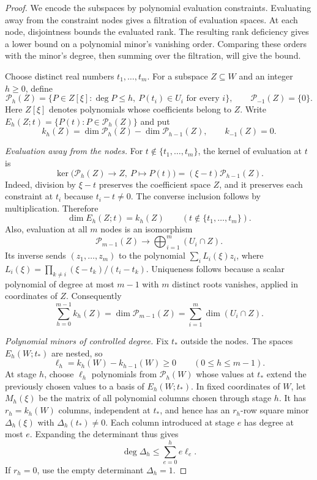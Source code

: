 \begin{proof}
We encode the subspaces by polynomial evaluation constraints.  Evaluating
away from the constraint nodes gives a filtration of evaluation spaces.
At each node, disjointness bounds the evaluated rank.  The resulting
rank deficiency gives a lower bound on a polynomial minor's vanishing
order.  Comparing these orders with the minor's degree, then summing
over the filtration, will give the bound.

Choose distinct real numbers $t_1,\ldots,t_m$.  For a subspace $Z\subseteq W$
and an integer $h\geq0$, define
\[
  \mathcal P_h(Z)=
  \{P\in Z[\xi]:\deg P\leq h,\ P(t_i)\in U_i\text{ for every }i\},
  \qquad \mathcal P_{-1}(Z)=\{0\}.
\]
Here $Z[\xi]$ denotes polynomials whose coefficients belong to $Z$.
Write $E_h(Z;t)=\{P(t):P\in\mathcal P_h(Z)\}$ and put
\[
  k_h(Z)=\dim\mathcal P_h(Z)-\dim\mathcal P_{h-1}(Z),
  \qquad k_{-1}(Z)=0.
\]

\emph{Evaluation away from the nodes.}
For $t\notin\{t_1,\ldots,t_m\}$, the kernel of evaluation at $t$ is
\[
  \ker\bigl(\mathcal P_h(Z)\longrightarrow Z,\ P\longmapsto P(t)\bigr)
  =(\xi-t)\mathcal P_{h-1}(Z).
\]
Indeed, division by $\xi-t$ preserves the coefficient space $Z$, and it
preserves each constraint at $t_i$ because $t_i-t\ne0$.  The converse
inclusion follows by multiplication.  Therefore
\begin{equation}
\label{eq:filtration-evaluation}
  \dim E_h(Z;t)=k_h(Z)
  \qquad(t\notin\{t_1,\ldots,t_m\}).
\end{equation}
Also, evaluation at all $m$ nodes is an isomorphism
\[
  \mathcal P_{m-1}(Z)\longrightarrow
  \bigoplus_{i=1}^{m}(U_i\cap Z).
\]
Its inverse sends $(z_1,\ldots,z_m)$ to the polynomial
$\sum_i L_i(\xi)z_i$, where
$L_i(\xi)=\prod_{k\ne i}(\xi-t_k)/(t_i-t_k)$.
Uniqueness follows because a scalar polynomial of degree at most $m-1$
with $m$ distinct roots vanishes, applied in coordinates of $Z$.
Consequently
\begin{equation}
\label{eq:filtration-sum}
  \sum_{h=0}^{m-1}k_h(Z)
  =\dim\mathcal P_{m-1}(Z)
  =\sum_{i=1}^{m}\dim(U_i\cap Z).
\end{equation}

\emph{Polynomial minors of controlled degree.}
Fix $t_*$ outside the nodes.  The spaces $E_h(W;t_*)$ are nested, so
\[
  \ell_h=k_h(W)-k_{h-1}(W)\geq0
  \qquad(0\leq h\leq m-1).
\]
At stage $h$, choose $\ell_h$ polynomials from $\mathcal P_h(W)$ whose
values at $t_*$ extend the previously chosen values to a basis of
$E_h(W;t_*)$.  In fixed coordinates of $W$, let $M_h(\xi)$ be the matrix
of all polynomial columns chosen through stage $h$.  It has
$r_h=k_h(W)$ columns, independent at $t_*$, and hence has an $r_h$-row
square minor $\Delta_h(\xi)$ with $\Delta_h(t_*)\ne0$.  Each column
introduced at stage $e$ has degree at most $e$.  Expanding the determinant
thus gives
\begin{equation}
\label{eq:minor-degree}
  \deg\Delta_h\leq\sum_{e=0}^{h}e\ell_e.
\end{equation}
If $r_h=0$, use the empty determinant $\Delta_h=1$.


\end{proof}

